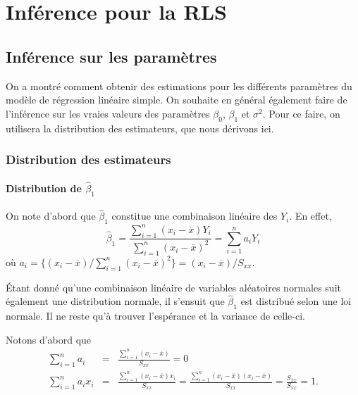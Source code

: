 \chapter{Inférence pour la RLS}
\label{sec:InferenceRLS}

\section{Inférence sur les paramètres}
\label{sec:InférenceParamètres}

On a montré comment obtenir des estimations pour les différents paramètres du modèle de régression linéaire simple. On souhaite en général également faire de l'inférence sur les vraies valeurs des paramètres $\beta_0$, $\beta_1$ et $\sigma^2$. Pour ce faire, on utilisera la distribution des estimateurs, que nous dérivons ici.

\subsection{Distribution des estimateurs}
\label{sec:LoisBetas}

\subsubsection{Distribution de $\hat{\beta}_1$}
\label{sec:LoiDeHatBeta1}


On note d'abord que $\hat{\beta}_1$ constitue une combinaison linéaire des $Y_i$. En effet,
$$ \hat{\beta}_1= \frac{\sum_{i=1}^n (x_i-\overline{x})Y_i}{\sum_{i=1}^n (x_i-\overline{x})^2} = \sum_{i=1}^n a_i Y_i
$$
o\`u $a_i= \{(x_i-\overline{x})/\sum_{i=1}^n(x_i-\overline{x})^2\} = (x_i-\overline{x})/S_{xx}$.

Étant donné qu'une combinaison linéaire de variables aléatoires normales suit également une distribution normale, il s'ensuit que $\hat\beta_1$ est distribué selon une loi normale. Il ne reste qu'à trouver l'espérance et la variance de celle-ci.

Notons d'abord que
 \begin{eqnarray*}
 \sum_{i=1}^n a_i & = & \frac{\sum_{i=1}^n(x_i-\overline{x})} {S_{xx}} = 0 \\
\sum_{i=1}^n a_i x_i & = & \frac{\sum_{i=1}^n(x_i-\overline{x})x_i } {S_{xx}} =\frac{\sum_{i=1}^n(x_i-\overline{x})(x_i-\overline{x})}{S_{xx}}=\frac{S_{xx}}{S_{xx}}=1.
\end{eqnarray*}




